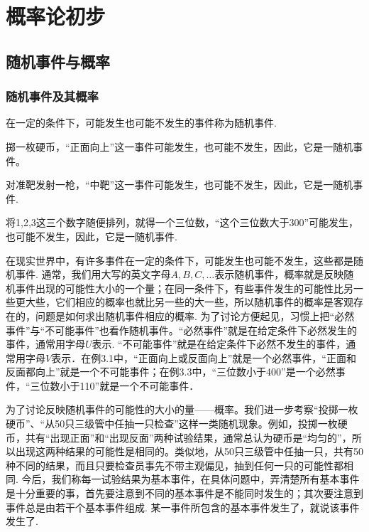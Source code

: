 \chapter{概率论初步}

\section{随机事件与概率}

\subsection{随机事件及其概率}
在一定的条件下，可能发生也可能不发生的事件称为随机事件.

\begin{example}
    掷一枚硬币，“正面向上”这一事件可能发生，也可能不发生，因此，它是一随机事件。
\end{example}

\begin{example}
    对准靶发射一枪，“中靶”这一事件可能发生，也可能不发生，因此，它是一随机事件.
\end{example}

\begin{example}
    将1,2,3这三个数字随便排列，就得一个三位数，“这个三位数大于300”可能发生，也可能不发生，因此，它是一随机事件.
\end{example}


在现实世界中，有许多事件在一定的条件下，可能发生也可能不发生，这些都是随机事件. 通常，我们用大写的英文字母$A,B,C,\ldots$表示随机事件，概率就是反映随机事件出现的可能性大小的一个量；在同一条件下，有些事件发生的可能性比另一些更大些，它们相应的概率也就比另一些的大一些，所以随机事件的概率是客观存在的，问题是如何求出随机事件相应的概率. 为了讨论方便起见，习惯上把“必然事件”与“不可能事件”也看作随机事件。“必然事件”就是在给定条件下必然发生的事件，通常用字母$U$表示. “不可能事件”就是在给定条件下必然不发生的事件，通常用字母$V$表示．在例3.1中，“正面向上或反面向上”就是一个必然事件，“正面和反面都向上”就是一个不可能事件；在例3.3中，“三位数小于400”是一个必然事件，“三位数小于110”就是一个不可能事件．

为了讨论反映随机事件的可能性的大小的量——概率。我们进一步考察“投掷一枚硬币”、“从50只三级管中任抽一只检查”这样一类随机现象。例如，投掷一枚硬币，共有“出现正面”和“出现反面”两种试验结果，通常总认为硬币是“均匀的”，所以出现这两种结果的可能性是相同的。类似地，从50只三级管中任抽一只，共有50种不同的结果，而且只要检查员事先不带主观偏见，抽到任何一只的可能性都相同. 今后，我们称每一试验结果为基本事件，在具体问题中，弄清楚所有基本事件是十分重要的事，首先要注意到不同的基本事件是不能同时发生的；其次要注意到事件总是由若干个基本事件组成. 某一事件所包含的基本事件发生了，就说该事件发生了.

